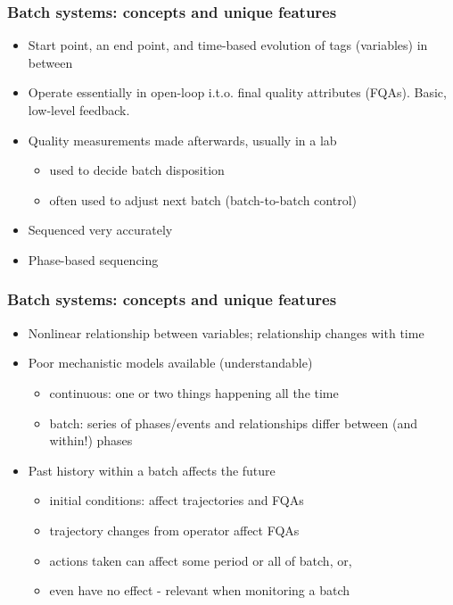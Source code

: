 \documentclass[handout, 12pt]{beamer}
\begin{document}
\begin{frame}\frametitle{Batch systems: concepts and unique features}

\begin{itemize}
	\item 	Start point, an end point, and time-based evolution of tags (variables) in between 
	
	\item 	Operate essentially in open-loop i.t.o. final quality attributes (FQAs).  Basic, low-level feedback. \pause
	
	\item 	Quality measurements made afterwards, usually in a lab
	
			\begin{itemize}
				\item	used to decide batch disposition
				\item	often used to adjust next batch (batch-to-batch control)
			\end{itemize}\pause
			
	\item	Sequenced very accurately
	
	\item	Phase-based sequencing

\end{itemize}
\end{frame}

\begin{frame}\frametitle{Batch systems: concepts and unique features}

\begin{itemize}
	
	\item	Nonlinear relationship between variables; relationship changes with time \pause
	
	\item	Poor mechanistic models available (understandable)
	
			\begin{itemize}
				\item	continuous: one or two things happening all the time
				\item	batch: series of phases/events and relationships differ between (and within!) phases
			\end{itemize} \pause
			
	\item 	Past history within a batch affects the future
	
			\begin{itemize}
				\item	initial conditions: affect trajectories and FQAs								
				\item	trajectory changes from operator affect FQAs
				\item	actions taken can affect some period or all of batch, or,
				\item	even have no effect - relevant when monitoring a batch
			\end{itemize}
\end{itemize}
\end{frame}
\end{document}
